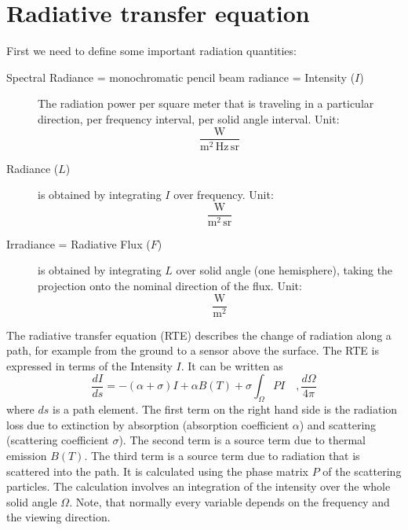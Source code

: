 \section{Radiative transfer equation}

First we need to define some important radiation quantities:
\begin{description}
\item[Spectral Radiance = monochromatic pencil beam radiance = Intensity ($I$)] The radiation power per square
  meter that is traveling in a particular direction, per frequency
  interval, per solid angle interval. Unit: 
  \begin{equation*}
    \frac{\mathrm{W}}{\mathrm{m^2  \, Hz \, sr}}
  \end{equation*}
\item[Radiance ($L$)] is obtained by integrating $I$ over frequency. Unit:
  \begin{equation*}
    \frac{\mathrm{W}}{\mathrm{m^2  \, sr}}
  \end{equation*}
\item[Irradiance = Radiative Flux ($F$)] is obtained by integrating $L$ over solid
  angle (one hemisphere), taking the projection onto the nominal
  direction of the flux. Unit:
  \begin{equation*}
    \frac{\mathrm{W}}{\mathrm{m^2}}
  \end{equation*}
\end{description}

The radiative transfer equation (RTE) describes the change of radiation along a path,
for example from the ground to a sensor above the surface. The RTE is expressed in 
terms of the Intensity $I$. It can be written as
\begin{equation}
	\frac{dI}{ds} = - (\alpha + \sigma)I + \alpha B(T) + \sigma \int_\Omega PI  \quad ,
	\frac{d\Omega}{4\pi}
\end{equation}
where $ds$ is a path element. The first term on the right hand side is 
the radiation loss due to extinction by absorption (absorption coefficient $\alpha$) 
and scattering (scattering coefficient $\sigma$). The second term is a source term
due to thermal emission $B(T)$. The third term is a source term due to radiation that
is scattered into the path. It is calculated using the phase matrix $P$ of the 
scattering particles. The calculation involves an integration of the intensity over the 
whole solid angle $\Omega$. Note, that normally every variable depends on the frequency
and the viewing direction. 

